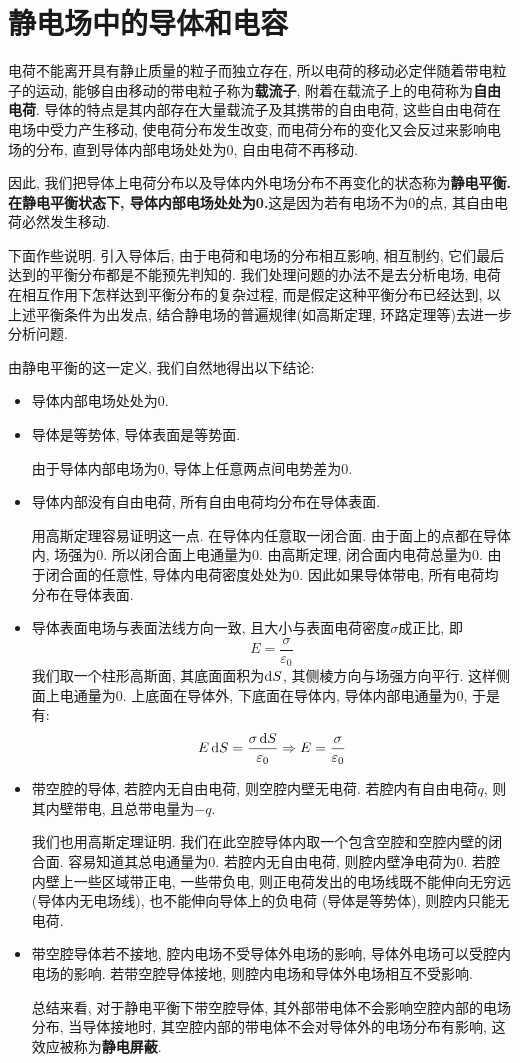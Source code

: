 \section{静电场中的导体和电容}
电荷不能离开具有静止质量的粒子而独立存在, 所以电荷的移动必定伴随着带电粒子的运动, 能够自由移动的带电粒子称为\textbf{载流子}, 附着在载流子上的电荷称为\textbf{自由电荷}. 导体的特点是其内部存在大量载流子及其携带的自由电荷, 这些自由电荷在电场中受力产生移动, 使电荷分布发生改变, 而电荷分布的变化又会反过来影响电场的分布, 直到导体内部电场处处为0, 自由电荷不再移动.

因此, 我们把导体上电荷分布以及导体内外电场分布不再变化的状态称为\textbf{静电平衡. 在静电平衡状态下, 导体内部电场处处为0.}这是因为若有电场不为0的点, 其自由电荷必然发生移动.

下面作些说明. 引入导体后, 由于电荷和电场的分布相互影响, 相互制约, 它们最后达到的平衡分布都是不能预先判知的. 我们处理问题的办法不是去分析电场, 电荷在相互作用下怎样达到平衡分布的复杂过程, 而是假定这种平衡分布已经达到, 以上述平衡条件为出发点, 结合静电场的普遍规律(如高斯定理, 环路定理等)去进一步分析问题.

由静电平衡的这一定义, 我们自然地得出以下结论:
\begin{itemize}
  \item 导体内部电场处处为0.
  \item 导体是等势体, 导体表面是等势面.

  由于导体内部电场为0, 导体上任意两点间电势差为0.
  \item 导体内部没有自由电荷, 所有自由电荷均分布在导体表面.

  用高斯定理容易证明这一点. 在导体内任意取一闭合面. 由于面上的点都在导体内, 场强为0. 所以闭合面上电通量为0. 由高斯定理, 闭合面内电荷总量为0. 由于闭合面的任意性, 导体内电荷密度处处为0. 因此如果导体带电, 所有电荷均分布在导体表面.

  \item 导体表面电场与表面法线方向一致, 且大小与表面电荷密度$\sigma$成正比, 即
  \[
  E = \frac{\sigma}{\varepsilon_0}
  \]
  我们取一个柱形高斯面, 其底面面积为$\mathop{}\!\mathrm{d} S$, 其侧棱方向与场强方向平行. 这样侧面上电通量为0. 上底面在导体外, 下底面在导体内, 导体内部电通量为0, 于是有:
  \[
  E \mathop{}\!\mathrm{d} S = \frac{\sigma \mathop{}\!\mathrm{d} S}{\varepsilon_0}
  \Rightarrow E = \frac{\sigma}{\varepsilon_0}
  \]

  \item 带空腔的导体, 若腔内无自由电荷, 则空腔内壁无电荷. 若腔内有自由电荷$q$, 则其内壁带电, 且总带电量为$-q$.

  我们也用高斯定理证明. 我们在此空腔导体内取一个包含空腔和空腔内壁的闭合面. 容易知道其总电通量为0. 若腔内无自由电荷, 则腔内壁净电荷为0. 若腔内壁上一些区域带正电, 一些带负电, 则正电荷发出的电场线既不能伸向无穷远 (导体内无电场线), 也不能伸向导体上的负电荷 (导体是等势体), 则腔内只能无电荷.

  \item 带空腔导体若不接地, 腔内电场不受导体外电场的影响, 导体外电场可以受腔内电场的影响. 若带空腔导体接地, 则腔内电场和导体外电场相互不受影响.

  总结来看, 对于静电平衡下带空腔导体, 其外部带电体不会影响空腔内部的电场分布, 当导体接地时, 其空腔内部的带电体不会对导体外的电场分布有影响, 这效应被称为\textbf{静电屏蔽}.
\end{itemize}

